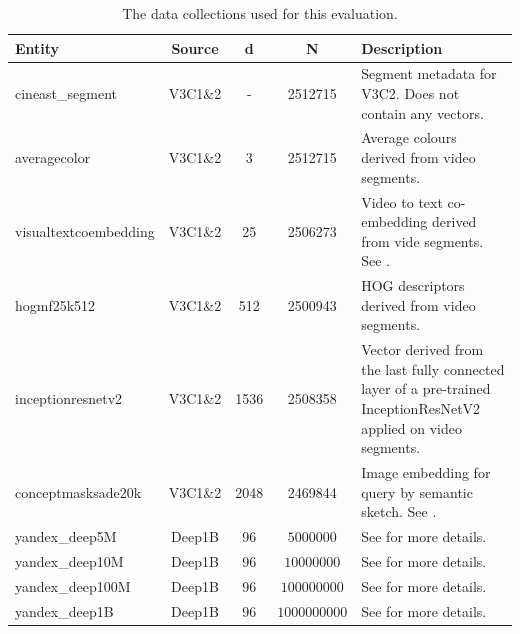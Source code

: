 \begin{table}
    \begin{tabular}{ | l | c | c | c | p{5cm} |}
        \hline
        \textbf{Entity} & \textbf{Source} & \textbf{d} & \textbf{N} & \textbf{Description} \\
        \hline
        \hline
        cineast\_segment & V3C1\&2  & - & 2512715 & Segment metadata for V3C2. Does not contain any vectors. \\ 
        \hline
        averagecolor & V3C1\&2  & 3 & 2512715 & Average colours derived from video segments. \\ 
        \hline
        visualtextcoembedding & V3C1\&2 & 25 & 2506273 & Video to text co-embedding derived from vide segments. See \cite{Spiess:2021Competitive}. \\
        \hline
        hogmf25k512  & V3C1\&2  & 512 & 2500943 & HOG \cite{Bay:2006surf} descriptors derived from video segments. \\
        \hline
        inceptionresnetv2 & V3C1\&2  & 1536 & 2508358 & Vector derived from the last fully connected layer of a pre-trained InceptionResNetV2 applied on video segments.\\
        \hline
        conceptmasksade20k & V3C1\&2 & 2048 & 2469844 & Image embedding for query by semantic sketch. See \cite{Rossetto:2019Query}. \\
        \hline
        yandex\_deep5M  & Deep1B  & 96 & $5000000$ & See \cite{Babenko:2016Efficient} for more details. \\
        \hline
        yandex\_deep10M  & Deep1B & 96 & $10000000$ & See \cite{Babenko:2016Efficient} for more details. \\
        \hline
        yandex\_deep100M  & Deep1B & 96 & $100000000$ & See \cite{Babenko:2016Efficient} for more details. \\
        \hline
        yandex\_deep1B  & Deep1B & 96 & $1000000000$ & See \cite{Babenko:2016Efficient} for more details. \\
        \hline
        \hline
    \end{tabular}
    \caption{The data collections used for this evaluation. }
    \label{table:datasets}
\end{table}

